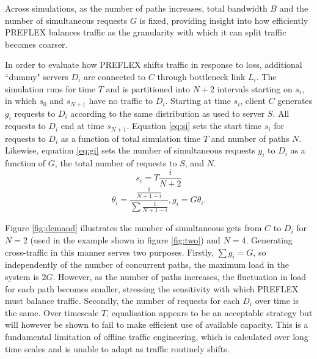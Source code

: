 Across simulations, as the number of paths increases, total bandwidth $B$ and the number of simultaneous requests $G$ is fixed, providing insight into how efficiently \ac{PREFLEX} balances traffic as the granularity with which it can split traffic becomes coarser.

In order to evaluate how \ac{PREFLEX} shifts traffic in response to loss, additional ``dummy" servers $D_i$ are connected to $C$ through bottleneck link $L_i$.
The simulation runs for time $T$ and is partitioned into $N+2$ intervals starting on $s_i$, in which $s_0$ and $s_{N+1}$ have no traffic to $D_i$. 
Starting at time $s_i$, client $C$ generates $g_i$ requests to $D_i$ according to the same distribution as used to server $S$. 
All requests to $D_i$ end at time $s_{N+1}$. 
Equation \eqref{eq:si} sets the start time $s_i$ for requests to $D_i$ as a function of total simulation time $T$ and number of paths $N$. 
Likewise, equation \eqref{eq:gi} sets the number of simultaneous requests $g_i$ to $D_i$ as a function of $G$, the total number of requests to $S$, and $N$.
\begin{equation}
s_i = T\frac{i}{N+2}
\label{eq:si}
\end{equation}
\begin{equation}
\theta_i = \frac{\frac{1}{N+1-i}}{\sum{\frac{1}{N+1-i}}},  g_i = G\theta_i.
\label{eq:gi}
\end{equation}

Figure \ref{fig:demand} illustrates the number of simultaneous gets from $C$ to $D_i$ for $N=2$ (used in the example shown in figure \ref{fig:two}) and $N=4$.
Generating cross-traffic in this manner serves two purposes. 
Firstly, $\sum{g_i}=G$, so independently of the number of concurrent paths, the maximum load in the system is $2G$. 
However, as the number of paths increases, the fluctuation in load for each path becomes smaller, stressing the sensitivity with which \ac{PREFLEX} must balance traffic. 
Secondly, the number of requests for each $D_i$ over time is the same. 
Over timescale $T$, equalisation appears to be an acceptable strategy but will however be shown to fail to make efficient use of available capacity. 
This is a fundamental limitation of offline traffic engineering, which is calculated over long time scales and is unable to adapt as traffic routinely shifts.

